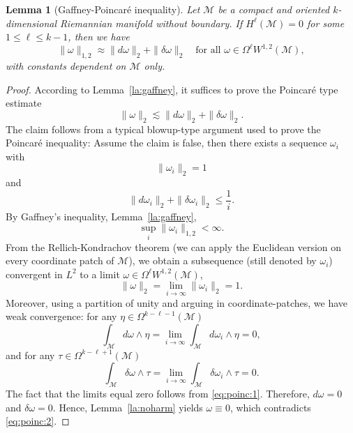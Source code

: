 \documentclass[intlimits,12pt,reqno]{amsart}
\newcommand{\cM}{\mathcal M}
\numberwithin{equation}{section}
\newtheorem{lemma}[theorem]{Lemma}
\theoremstyle{definition}
\begin{document}
\begin{lemma}[Gaffney-Poincar\'e inequality]
\label{pr:Poincare}
Let $\cM$ be a compact and oriented $k$-dimensional Riemannian manifold without boundary. 
If $H^\ell(\mathcal{M})=0$ for some $1 \leq \ell \leq k-1$, then
we have
\[
\|\omega \|_{1,2} \approx \|d\omega \|_{2} + \|\delta \omega \|_{2} 
\quad
\text{for all } \omega\in\Omega^\ell W^{1,2}(\cM),
\]
with constants dependent on $\cM$ only.
\end{lemma}
\begin{proof}
According to Lemma~\ref{la:gaffney}, it suffices to prove the Poincar\'e type estimate
\[
\|\omega \|_{2} \lesssim \|d\omega \|_{2} + \|\delta \omega \|_{2}.
\]
The claim follows from a typical blowup-type argument used to prove the  Poincar\'e inequality: Assume the claim is false, then there exists a sequence $\omega_i$ with
\[
 \|\omega_i \|_{2} = 1
\]
and
\begin{equation}
\label{eq:poinc:1}
 \|d\omega_i \|_{2} + \|\delta \omega_i \|_{2} \leq \frac{1}{i}.
\end{equation}
By Gaffney's inequality, Lemma~\ref{la:gaffney},
\[
 \sup_{i} \|\omega_i\|_{1,2} < \infty.
\]
From the Rellich-Kondrachov theorem (we can apply the Euclidean version on every coordinate patch of $\mathcal{M}$), we obtain a subsequence (still denoted by $\omega_i$) convergent in $L^2$ to a limit $\omega \in \Omega^\ell W^{1,2}(\cM)$,
\begin{equation}
\label{eq:poinc:2}
\|\omega \|_{2} = \lim_{i \to \infty} \|\omega_i \|_{2} = 1.
\end{equation}
Moreover, using a partition of unity and arguing in coordinate-patches, we have weak convergence: for any $\eta \in \Omega^{k-\ell-1}(\cM)$
\[
\int_{\mathcal{M}} d\omega \wedge \eta = \lim_{i\to\infty}  \int_{\mathcal{M}} d\omega_i \wedge \eta=0,
\]
and  for any $\tau \in \Omega^{k-\ell+1}(\cM)$
\[
\int_{\mathcal{M}} \delta \omega \wedge \tau =\lim_{i\to\infty}  \int_{\mathcal{M}} \delta \omega_i \wedge \tau=0.
\]
The fact that the limits equal zero follows from \eqref{eq:poinc:1}.
Therefore, 
$d\omega = 0$ and $\delta \omega = 0$. Hence, Lemma~\ref{la:noharm} yields $\omega \equiv 0$, which contradicts \eqref{eq:poinc:2}.
\end{proof}
\end{document}
